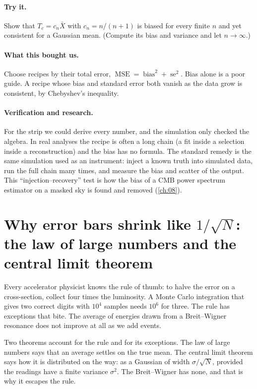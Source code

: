 \paragraph{Try it.}
Show that $T_c=c_n\bar X$ with $c_n=n/(n+1)$ is biased for every finite $n$
and yet consistent for a Gaussian mean. (Compute its bias and variance and
let $n\to\infty$.)

\paragraph{What this bought us.}
Choose recipes by their total error, $\operatorname{MSE}=\operatorname{bias}^2
+\operatorname{se}^2$. Bias alone is a poor guide. A recipe whose bias and
standard error both vanish as the data grow is consistent, by Chebyshev's
inequality.

\paragraph{Verification and research.}
For the strip we could derive every number, and the simulation only checked
the algebra. In real analyses the recipe is often a long chain (a fit
inside a selection inside a reconstruction) and the bias has no formula. The
standard remedy is the same simulation used as an instrument: inject a known
truth into simulated data, run the full chain many times, and measure the
bias and scatter of the output. This ``injection--recovery'' test is how
the bias of a CMB power spectrum estimator on a masked sky is found and
removed (\cref{ch:08}).

\section{Why error bars shrink like $1/\sqrt N$: the law of large numbers and the central limit theorem}
\label{3a:sec:lln-clt}

Every accelerator physicist knows the rule of thumb: to halve the error on
a cross-section, collect four times the luminosity. A Monte Carlo
integration that gives two correct digits with $10^4$ samples needs $10^6$
for three. The rule has exceptions that bite. The average of energies
drawn from a Breit--Wigner resonance does not improve at all as we add
events.

Two theorems account for the rule and for its exceptions. The law of large
numbers says that an average settles on the true mean. The central limit
theorem says how it is distributed on the way: as a Gaussian of width
$\sigma/\sqrt N$, provided the readings have a finite variance $\sigma^2$.
The Breit--Wigner has none, and that is why it escapes the rule.

